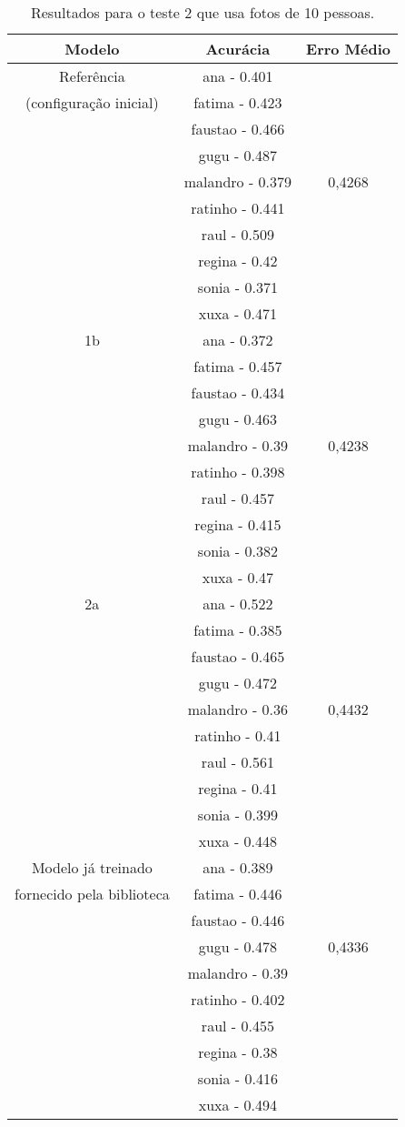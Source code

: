 \documentclass[twoside,conference,a4paper]{IEEEtran}
\begin{document}
\begin{table}[]
    \centering
    \begin{tabular}{|ccc|}
    \hline
    Modelo & Acurácia & Erro Médio\\
    \hline
    Referência & ana - 0.401 &\\
    (configuração inicial) & fatima - 0.423  & \\
    & faustao - 0.466 & \\
    & gugu - 0.487 & \\
    & malandro - 0.379  & 0,4268\\
    & ratinho - 0.441 & \\
    & raul - 0.509  & \\
    & regina - 0.42 & \\
    & sonia - 0.371 & \\
    & xuxa - 0.471 & \\
    \hline
    1b & ana - 0.372 &\\
    & fatima - 0.457 & \\
    & faustao - 0.434 & \\
    & gugu - 0.463 & \\
    & malandro - 0.39 & 0,4238\\
    & ratinho - 0.398 & \\
    & raul - 0.457 & \\
    & regina - 0.415 & \\
    & sonia - 0.382 & \\
    & xuxa - 0.47 & \\
    \hline
    2a & ana - 0.522 &\\
    & fatima - 0.385 & \\
    & faustao - 0.465 & \\
    & gugu - 0.472 & \\
    & malandro - 0.36 & 0,4432\\
    & ratinho - 0.41 & \\
    & raul - 0.561 & \\
    & regina - 0.41 & \\
    & sonia - 0.399 & \\
    & xuxa - 0.448 & \\
    \hline
    Modelo já treinado & ana - 0.389 &\\
    fornecido pela biblioteca& fatima - 0.446 & \\
    & faustao - 0.446 & \\
    & gugu - 0.478 & 0,4336\\
    & malandro - 0.39 & \\
    & ratinho - 0.402 & \\
    & raul - 0.455 & \\
    & regina - 0.38 & \\
    & sonia - 0.416 & \\
    & xuxa - 0.494 & \\
\hline
    \end{tabular}
    \caption{Resultados para o teste 2 que usa fotos de 10 pessoas.}
    \label{tab:results2}
\end{table}
\end{document}
